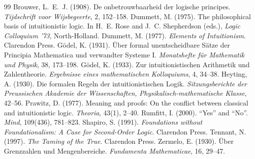 \documentclass{situationist-preprint}
\begin{document}
\begin{thebibliography}{99}\small
{} Brouwer, L.~E.~J. (1908). De onbetrouwbaarheid der logische principes. \emph{Tijdschrift voor Wijsbegeerte}, 2, 152--158.
 Dummett, M. (1975). The philosophical basis of intuitionistic logic. In H.~E. Rose and J.~C. Shepherdson (eds.), \emph{Logic Colloquium '73}, North-Holland.
 Dummett, M. (1977). \emph{Elements of Intuitionism}. Clarendon Press.
 G{\"o}del, K. (1931). {\"U}ber formal unentscheidbare S{\"a}tze der Principia Mathematica und verwandter Systeme I. \emph{Monatshefte f{\"u}r Mathematik und Physik}, 38, 173--198.
 G{\"o}del, K. (1933). Zur intuitionistischen Arithmetik und Zahlentheorie. \emph{Ergebnisse eines mathematischen Kolloquiums}, 4, 34--38.
 Heyting, A. (1930). Die formalen Regeln der intuitionistischen Logik. \emph{Sitzungsberichte der Preussischen Akademie der Wissenschaften, Physikalisch-mathematische Klasse}, 42--56.
 Prawitz, D. (1977). Meaning and proofs: On the conflict between classical and intuitionistic logic. \emph{Theoria}, 43(1), 2--40.
 Rumfitt, I. (2000). \enquote{Yes} and \enquote{No}. \emph{Mind}, 109(436), 781--823.
 Shapiro, S. (1991). \emph{Foundations without Foundationalism: A Case for Second-Order Logic}. Clarendon Press.
 Tennant, N. (1997). \emph{The Taming of the True}. Clarendon Press.
 Zermelo, E. (1930). {\"U}ber Grenzzahlen und Mengenbereiche. \emph{Fundamenta Mathematicae}, 16, 29--47.
\end{thebibliography}
\end{document}
